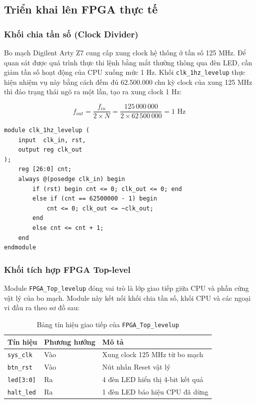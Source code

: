 
\subsection{Triển khai lên FPGA thực tế}

\subsubsection{Khối chia tần số (Clock Divider)}
Bo mạch Digilent Arty Z7 cung cấp xung clock hệ thống ở tần số 125 MHz. Để quan sát được quá trình thực thi lệnh bằng mắt thường thông qua đèn LED, cần giảm tần số hoạt động của CPU xuống mức 1 Hz. Khối \texttt{clk\_1hz\_levelup} thực hiện nhiệm vụ này bằng cách đếm đủ 62.500.000 chu kỳ clock của xung 125 MHz thì đảo trạng thái ngõ ra một lần, tạo ra xung clock 1 Hz:

$$f_{out} = \frac{f_{in}}{2 \times N} = \frac{125\,000\,000}{2 \times 62\,500\,000} = 1 \text{ Hz}$$

\begin{lstlisting}[caption=Mã nguồn Verilog cho bộ chia tần số]
module clk_1hz_levelup (
    input  clk_in, rst,
    output reg clk_out
);
    reg [26:0] cnt;
    always @(posedge clk_in) begin
        if (rst) begin cnt <= 0; clk_out <= 0; end
        else if (cnt == 62500000 - 1) begin
            cnt <= 0; clk_out <= ~clk_out;
        end
        else cnt <= cnt + 1;
    end
endmodule
\end{lstlisting}

\subsubsection{Khối tích hợp FPGA Top-level}
Module \texttt{FPGA\_Top\_levelup} đóng vai trò là lớp giao tiếp giữa CPU và phần cứng vật lý của bo mạch. Module này kết nối khối chia tần số, khối CPU và các ngoại vi đầu ra theo sơ đồ sau:

\begin{table}[H]
\centering
\begin{tabular}{|l|l|l|}
\hline
\textbf{Tín hiệu} & \textbf{Phương hướng} & \textbf{Mô tả} \\
\hline
\texttt{sys\_clk}  & Vào  & Xung clock 125 MHz từ bo mạch \\
\texttt{btn\_rst}  & Vào  & Nút nhấn Reset vật lý \\
\texttt{led[3:0]}  & Ra   & 4 đèn LED hiển thị 4-bit kết quả \\
\texttt{halt\_led} & Ra   & 1 đèn LED báo hiệu CPU đã dừng \\
\hline
\end{tabular}
\caption{Bảng tín hiệu giao tiếp của \texttt{FPGA\_Top\_levelup}}
\label{tab:fpga_top_io}
\end{table}

